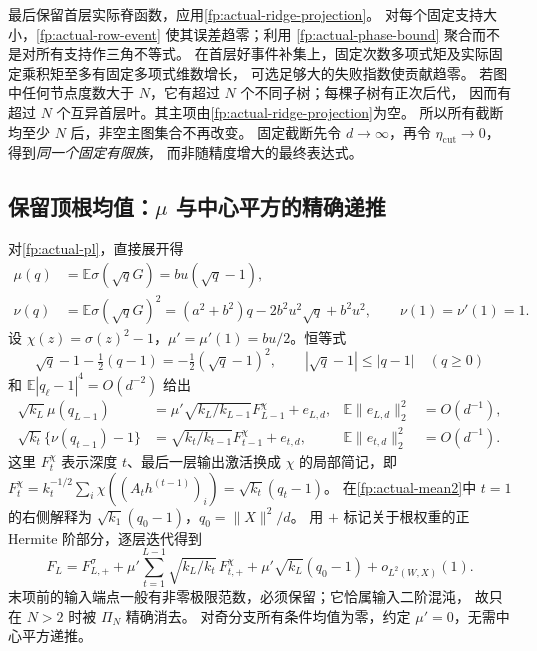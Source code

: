 \documentclass[a4paper]{tufte-handout}
\newcommand{\ecut}{\eta_{\mathrm{cut}}}
\begin{document}
\begin{fullwidth}
最后保留首层实际脊函数，应用\eqref{fp:actual-ridge-projection}。
对每个固定支持大小，\eqref{fp:actual-row-event} 使其误差趋零；利用
\eqref{fp:actual-phase-bound} 聚合而不是对所有支持作三角不等式。
在首层好事件补集上，固定次数多项式矩及实际固定乘积矩至多有固定多项式维数增长，
可选足够大的失败指数使贡献趋零。
若图中任何节点度数大于 $N$，它有超过 $N$ 个不同子树；每棵子树有正次后代，
因而有超过 $N$ 个互异首层叶。其主项由\eqref{fp:actual-ridge-projection}为空。
所以所有截断均至少 $N$ 后，非空主图集合不再改变。
固定截断先令 $d\to\infty$，再令 $\ecut\to0$，得到\emph{同一个固定有限族}，
而非随精度增大的最终表达式。

\subsection{保留顶根均值：$\mu$ 与中心平方的精确递推}
\label{fp:actual-mean}
对\eqref{fp:actual-pl}，直接展开得
\begin{align}
 \mu(q)&=\mathbb E\sigma(\sqrt qG)=bu(\sqrt q-1),\\
 \nu(q)&=\mathbb E\sigma(\sqrt qG)^2
 =(a^2+b^2)q-2b^2u^2\sqrt q+b^2u^2,
 \qquad \nu(1)=\nu'(1)=1.
\end{align}
设 $\chi(z)=\sigma(z)^2-1$，$\mu'=\mu'(1)=bu/2$。恒等式
\begin{equation}\label{fp:actual-sqrt}
 \sqrt q-1-\tfrac12(q-1)=-\tfrac12(\sqrt q-1)^2,
 \qquad |\sqrt q-1|\leq |q-1|\quad(q\geq0)
\end{equation}
和 $\mathbb E|q_\ell-1|^4=O(d^{-2})$ 给出
\begin{align}
 \sqrt{k_L}\mu(q_{L-1})
 &=\mu'\sqrt{k_L/k_{L-1}}F_{L-1}^{\chi}+e_{L,d},
 &\mathbb E\|e_{L,d}\|_2^2&=O(d^{-1}),\label{fp:actual-mean1}\\
 \sqrt{k_t}\{\nu(q_{t-1})-1\}
 &=\sqrt{k_t/k_{t-1}}F_{t-1}^{\chi}+e_{t,d},
 &\mathbb E\|e_{t,d}\|_2^2&=O(d^{-1}).\label{fp:actual-mean2}
\end{align}
这里 $F_t^\chi$ 表示深度 $t$、最后一层输出激活换成 $\chi$ 的局部简记，即 $F_t^\chi=k_t^{-1/2}\sum_i\chi((A_th^{(t-1)})_i)
=\sqrt{k_t}(q_t-1)$。
在\eqref{fp:actual-mean2}中 $t=1$ 的右侧解释为
$\sqrt{k_1}(q_0-1)$，$q_0=\|X\|^2/d$。
用 $+$ 标记关于根权重的正 Hermite 阶部分，逐层迭代得到
\begin{equation}\label{fp:actual-mean-telescope}
 F_L=F_{L,+}^{\sigma}
 +\mu'\sum_{t=1}^{L-1}\sqrt{k_L/k_t}\,F_{t,+}^{\chi}
 +\mu'\sqrt{k_L}(q_0-1)+o_{L^2(W,X)}(1).
\end{equation}
末项前的输入端点一般有非零极限范数，必须保留；它恰属输入二阶混沌，
故只在 $N>2$ 时被 $\Pi_N$ 精确消去。
对奇分支所有条件均值为零，约定 $\mu'=0$，无需中心平方递推。


\end{fullwidth}
\end{document}
